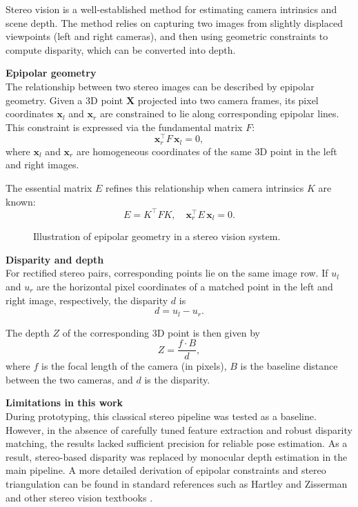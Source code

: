 Stereo vision is a well-established method for estimating camera intrinsics and scene depth. The method relies on capturing two images from slightly displaced viewpoints (left and right cameras), and then using geometric constraints to compute disparity, which can be converted into depth.

\textbf{Epipolar geometry} \\
The relationship between two stereo images can be described by epipolar geometry. Given a 3D point $\mathbf{X}$ projected into two camera frames, its pixel coordinates $\mathbf{x}_l$ and $\mathbf{x}_r$ are constrained to lie along corresponding epipolar lines. This constraint is expressed via the fundamental matrix $F$:
\[
\mathbf{x}_r^\top F \,\mathbf{x}_l = 0,
\]
where $\mathbf{x}_l$ and $\mathbf{x}_r$ are homogeneous coordinates of the same 3D point in the left and right images.

The essential matrix $E$ refines this relationship when camera intrinsics $K$ are known:
\[
E = K^\top F K, \quad
\mathbf{x}_r^\top E \,\mathbf{x}_l = 0.
\]

\begin{figure}[ht]
    \centering
    \caption[Epipolar geometry in stereo vision]{Illustration of epipolar geometry in a stereo vision system.}
    \label{fig:epipolar}
\end{figure}

\textbf{Disparity and depth} \\
For rectified stereo pairs, corresponding points lie on the same image row. If $u_l$ and $u_r$ are the horizontal pixel coordinates of a matched point in the left and right image, respectively, the disparity $d$ is
\[
d = u_l - u_r.
\]

The depth $Z$ of the corresponding 3D point is then given by
\[
Z = \frac{f \cdot B}{d},
\]
where $f$ is the focal length of the camera (in pixels), $B$ is the baseline distance between the two cameras, and $d$ is the disparity.

\textbf{Limitations in this work} \\
During prototyping, this classical stereo pipeline was tested as a baseline. However, in the absence of carefully tuned feature extraction and robust disparity matching, the results lacked sufficient precision for reliable pose estimation. As a result, stereo-based disparity was replaced by monocular depth estimation in the main pipeline. A more detailed derivation of epipolar constraints and stereo triangulation can be found in standard references such as Hartley and Zisserman \cite{ref:hartleyzisserman} and other stereo vision textbooks \cite{ref:stereo}.

